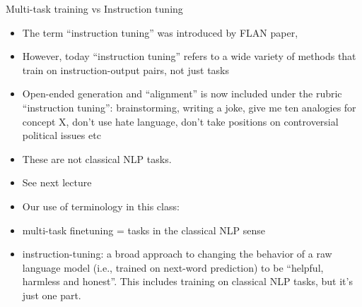 \begin{vbframe}{Multi-task training vs Instruction tuning}

\vfill

\begin{itemize}
\item The term ``instruction tuning'' was introduced by FLAN paper,
\item However, today ``instruction tuning'' refers to a wide
variety of methods that train on instruction-output pairs,
    not just tasks
    \item
Open-ended generation and ``alignment'' 
is now included under
    the rubric ``instruction tuning'': brainstorming,
    writing a joke, give me ten analogies for concept X,
    don't use hate language, don't take positions on
    controversial political issues etc
\item These are not classical NLP tasks.
\item See next lecture
\item Our use of terminology in this class:
\item multi-task finetuning = tasks in the classical NLP
    sense
    \item instruction-tuning: a broad approach to changing
    the behavior of a raw language model (i.e., trained on
    next-word prediction) to be ``helpful, harmless and
    honest''. This includes training on classical NLP tasks,
    but it's just one part.
\end{itemize}

\vfill

\end{vbframe}

